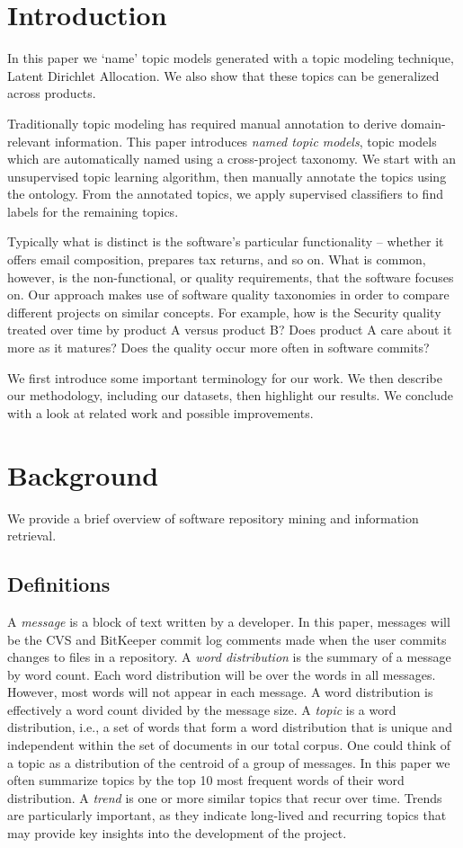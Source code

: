 \documentclass[10pt, conference, compsocconf]{IEEEtran}
\begin{document}
\section{Introduction}
In this paper we `name' topic models generated with a topic modeling technique, Latent Dirichlet Allocation. We also show that these topics can be generalized across products.

Traditionally topic modeling has required manual annotation to derive domain-relevant information. This paper introduces \emph{named topic models}, topic models which are automatically named using a cross-project taxonomy. We start with an unsupervised topic learning algorithm, then manually annotate the topics using the ontology. From the annotated topics, we apply supervised classifiers to find labels for the remaining topics. 

Typically what is distinct is the software's particular functionality -- whether it offers email composition, prepares tax returns, and so on. What is common, however, is the non-functional, or quality requirements, that the software focuses on. Our approach makes use of software quality taxonomies in order to compare different projects on similar concepts. For example, how is the Security quality treated over time by product A versus product B? Does product A care about it more as it matures? Does the quality occur more often in software commits?

We first introduce some important terminology for our work. We then describe our methodology, including our datasets, then highlight our results. We conclude with a look at related work and possible improvements.

\section{Background}
We provide a brief overview of software repository mining and information retrieval.
\subsection{Definitions}
A \emph{message} is a block of text written by a developer. In this
paper, messages will be the CVS and BitKeeper commit log comments made
when the user commits changes to files in a repository. A \emph{word
  distribution} is the summary of a message by word count. Each word
distribution will be over the words in all messages. However, most
words will not appear in each message. A word distribution is effectively
a word count divided by the message size. A \emph{topic} is a word
distribution, i.e., a set of words that form a word distribution that is
unique and independent within the set of documents in our total
corpus. One could think of a topic as a distribution of the centroid
of a group of messages. In this paper we often summarize topics by the
top 10 most frequent words of their word distribution.  A \emph{trend}
is one or more similar topics that recur over time.  Trends are
particularly important, as they indicate long-lived and recurring
topics that may provide key insights into the development of the
project.
\end{document}
